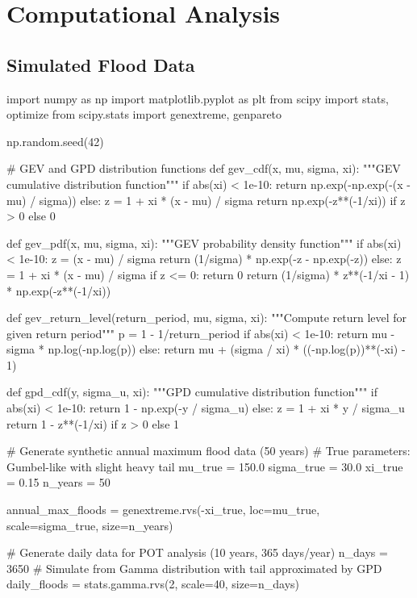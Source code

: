 \documentclass[a4paper, 11pt]{article}
\begin{document}
\section{Computational Analysis}

\subsection{Simulated Flood Data}

\begin{pycode}
import numpy as np
import matplotlib.pyplot as plt
from scipy import stats, optimize
from scipy.stats import genextreme, genpareto

np.random.seed(42)

# GEV and GPD distribution functions
def gev_cdf(x, mu, sigma, xi):
    """GEV cumulative distribution function"""
    if abs(xi) < 1e-10:
        return np.exp(-np.exp(-(x - mu) / sigma))
    else:
        z = 1 + xi * (x - mu) / sigma
        return np.exp(-z**(-1/xi)) if z > 0 else 0

def gev_pdf(x, mu, sigma, xi):
    """GEV probability density function"""
    if abs(xi) < 1e-10:
        z = (x - mu) / sigma
        return (1/sigma) * np.exp(-z - np.exp(-z))
    else:
        z = 1 + xi * (x - mu) / sigma
        if z <= 0:
            return 0
        return (1/sigma) * z**(-1/xi - 1) * np.exp(-z**(-1/xi))

def gev_return_level(return_period, mu, sigma, xi):
    """Compute return level for given return period"""
    p = 1 - 1/return_period
    if abs(xi) < 1e-10:
        return mu - sigma * np.log(-np.log(p))
    else:
        return mu + (sigma / xi) * ((-np.log(p))**(-xi) - 1)

def gpd_cdf(y, sigma_u, xi):
    """GPD cumulative distribution function"""
    if abs(xi) < 1e-10:
        return 1 - np.exp(-y / sigma_u)
    else:
        z = 1 + xi * y / sigma_u
        return 1 - z**(-1/xi) if z > 0 else 1

# Generate synthetic annual maximum flood data (50 years)
# True parameters: Gumbel-like with slight heavy tail
mu_true = 150.0
sigma_true = 30.0
xi_true = 0.15
n_years = 50

annual_max_floods = genextreme.rvs(-xi_true, loc=mu_true, scale=sigma_true, size=n_years)

# Generate daily data for POT analysis (10 years, 365 days/year)
n_days = 3650
# Simulate from Gamma distribution with tail approximated by GPD
daily_floods = stats.gamma.rvs(2, scale=40, size=n_days)


\end{pycode}
\end{document}
